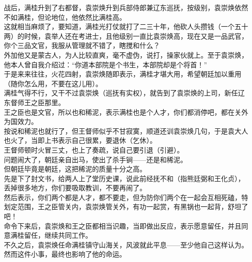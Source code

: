 \begin{multicols}{\theparacolNo}
战后，满桂升到了右都督，袁崇焕升到兵部侍郎兼辽东巡抚，按级别，袁崇焕依然不如满桂，但论地位，他依然比满桂高。\\

这就相当麻烦了，要知道，满桂光打仗就打了二三十年，他砍人头攒钱（一个五十两）的时候，袁举人还在考进士，且他级别一直比袁崇焕高，现在又是一品武官，你个三品文官，我服从管理就不错了，瞎搅和什么？\\

外加他又是蒙古人，为人比较直爽，毫不虚伪，说打，操家伙就上。至于袁崇焕，他本人曾自我介绍过：“你道本部院是个书生，本部院却是个将首！”\\

于是来来往往，火花四射，袁崇焕随即表示，满桂才堪大用，希望朝廷加以重用（随你怎么用，不要在这儿用）。\\

满桂气得不行，又干不过袁崇焕（巡抚有实权），就告到了袁崇焕的上司，新任辽东督师王之臣那里。\\

王之臣也是文官，所以也和稀泥，表示满桂也是个人才，你们都消停吧，都在关外为国效力。\\

按说和稀泥也就行了，但王督师似乎不甘寂寞，顺道还训袁崇焕几句，于是袁大人也火了，当即上书表示自己很累，要退休（乞休）。\\

王督师顿时火冒三丈，也上了奏疏，说自己要引退（引避）。\\

问题闹大了，朝廷亲自出马，使出了杀手锏——还是和稀泥。\\

但朝廷毕竟是朝廷，这把稀泥的质量十分之高。\\

先是下了封文书，给两人上了堂历史课，说此前经抚不和（指熊廷弼和王化贞），丢掉很多地方，你们要吸取教训，不要再闹了。\\

然后表示，你们两个都是人才，都不要走，但为防你们两个在一起会互相死磕，特划定范围，王之臣管关内，袁崇焕管关外，有功一起赏，有黑锅也一起背，舒坦了吧！\\

命令下来后，袁崇焕和王之臣都相当识趣，当即做出反应，表示愿意留任，并且同意满桂留任，继续共同工作。\\

不久之后，袁崇焕任命满桂镇守山海关，风波就此平息——至少他自己这样认为。\\

然而这件小事，最终也影响了他的命运。\\


\end{multicols}
